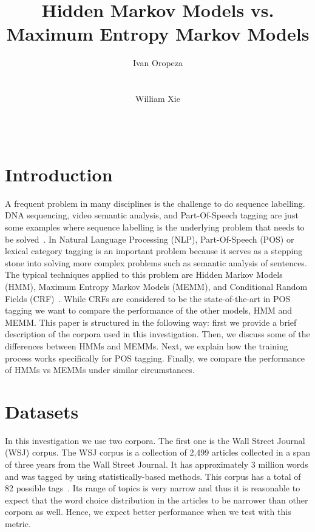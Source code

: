 \documentclass{acm_proc_article-sp}
\begin{document}
\author{
\alignauthor
Ivan Oropeza\\
       \\
       \\
\alignauthor
William Xie\\
       \\
       \\
}

\title{Hidden Markov Models vs. Maximum Entropy Markov Models}


\maketitle
\section{Introduction}
A frequent problem in many disciplines is the challenge to do sequence labelling. DNA sequencing, video semantic analysis, and Part-Of-Speech tagging are just some examples where sequence labelling is the underlying problem that needs to be solved~\cite{dnaEx, videoEx, nlpEx}. In Natural Language Processing (NLP), Part-Of-Speech (POS) or lexical category tagging is an important problem because it serves as a stepping stone into solving more complex problems such as semantic analysis of sentences. The typical techniques applied to this problem are Hidden Markov Models (HMM), Maximum Entropy Markov Models (MEMM), and Conditional Random Fields (CRF)~\cite{nlpBook}. While CRFs are considered to be the state-of-the-art in POS tagging we want to compare the performance of the other models, HMM and MEMM. This paper is structured in the following way: first we provide a brief description of the corpora used in this investigation. Then, we discuss some of the differences between HMMs and MEMMs. Next, we explain how the training process works specifically for POS tagging. Finally, we compare the performance of HMMs vs MEMMs under similar circumstances.

\section{Datasets}
In this investigation we use two corpora. The first one is the Wall Street Journal (WSJ) corpus. The WSJ corpus is a collection of 2,499 articles collected in a span of three years from the Wall Street Journal. It has approximately 3 million words and was tagged by using statistically-based methods. This corpus has a total of 82 possible tags~\cite{wsjCorpus}. Its range of topics is very narrow and thus it is reasonable to expect that the word choice distribution in the articles to be narrower than other corpora as well. Hence, we expect better performance when we test with this metric.
\end{document}
